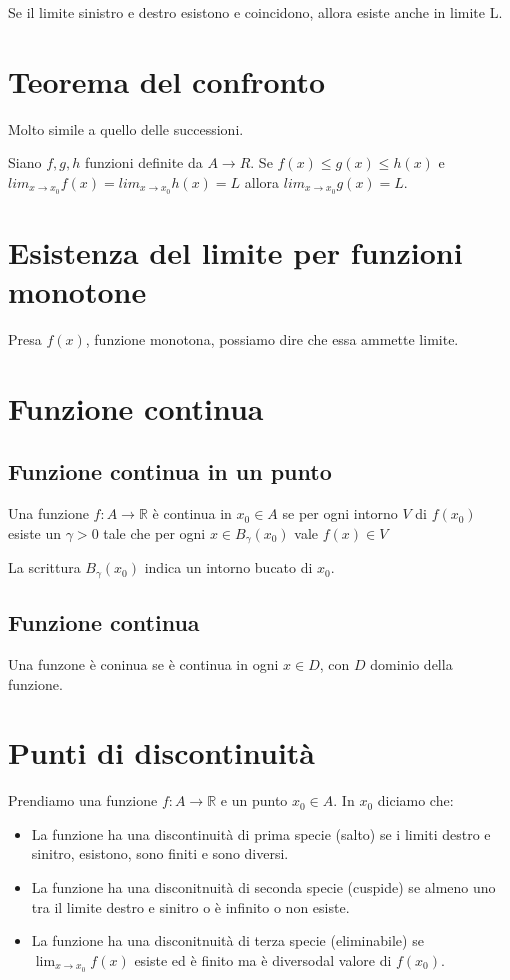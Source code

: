 Se il limite sinistro e destro esistono e coincidono, allora esiste anche in limite L.

\section{Teorema del confronto}
Molto simile a quello delle successioni.

Siano $f,g,h$ funzioni definite da $A\rightarrow R$. Se $f(x) \leq g(x) \leq h(x)$ e $lim_{x\to x_0}f(x) = lim_{x\to x_0}h(x) = L$ allora $lim_{x\to x_0}g(x) = L$.

\section{Esistenza del limite per funzioni monotone}

Presa $f(x)$, funzione monotona, possiamo dire che essa ammette limite.


\section{Funzione continua}

\subsection{Funzione continua in un punto}
Una funzione $f: A \rightarrow \mathbb{R}$ è continua in $x_0 \in A$ se per ogni intorno $V$ di $f(x_0)$ esiste un $\gamma > 0$ tale che per ogni $x \in B_{\gamma}(x_0)$ vale $f(x)\in V$

\begin{tip}
La scrittura $B_{\gamma}(x_0)$ indica un intorno bucato di $x_0$.
\end{tip}

\subsection{Funzione continua}
Una funzone è coninua se è continua in ogni $x\in D$, con $D$ dominio della funzione.

\section{Punti di discontinuità}
Prendiamo una funzione $f:A \rightarrow \mathbb{R}$ e un punto $x_0\in A$. In $x_0$ diciamo che:
\begin{itemize}
\item La funzione ha una discontinuità di prima specie (salto) se i limiti destro e sinitro, esistono, sono finiti e sono diversi.
\item La funzione ha una disconitnuità di seconda specie (cuspide) se almeno uno tra il limite destro e sinitro o è infinito o non esiste.
\item La funzione ha una disconitnuità di terza specie (eliminabile) se $\lim_{x\to x_0}f(x)$ esiste ed è finito ma è diversodal valore di $f(x_0)$. 
\end{itemize}

